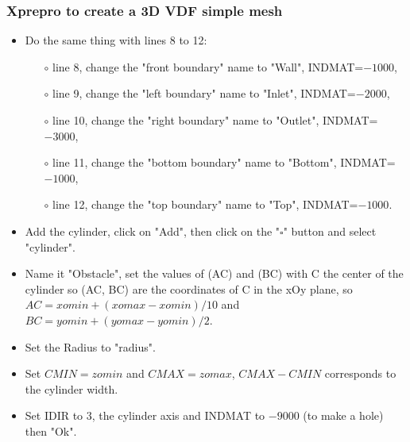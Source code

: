 \documentclass[10pt, hyperref={unicode=true,pdfusetitle, bookmarks=true,bookmarksnumbered=false,bookmarksopen=false, breaklinks=false,pdfborder={0 0 1},backref=true,colorlinks=true,linkcolor=darkblue,pageanchor}]{beamer}
\begin{document}
\begin{frame}
\frametitle{Xprepro to create a 3D VDF simple mesh}
\begin{block}{}

\begin{itemize}
\item Do the same thing with lines 8 to 12:
    \begin{itemize}
    \item [$\circ$] line 8, change the "front boundary" name to "Wall", INDMAT=$-1000$,
    \item [$\circ$] line 9, change the "left boundary" name to "Inlet", INDMAT=$-2000$,
    \item [$\circ$] line 10, change the "right boundary" name to "Outlet", INDMAT=$-3000$,
    \item [$\circ$] line 11, change the "bottom boundary" name to "Bottom", INDMAT=$-1000$,
    \item [$\circ$] line 12, change the "top boundary" name to "Top", INDMAT=$-1000$.
    \end{itemize}
\item Add the cylinder, click on "Add", then click on the "$\square$" button and select "cylinder".
\item Name it "Obstacle", set the values of (AC) and (BC) with C the center of the cylinder so (AC, BC) are the coordinates of C in the xOy plane, so $AC=xomin+(xomax-xomin)/10$ and $BC=yomin+(yomax-yomin)/2$.
\item Set the Radius to "radius".
\item Set $CMIN=zomin$ and $CMAX=zomax$, $CMAX-CMIN$ corresponds to the cylinder width.
\item Set IDIR to $3$, the cylinder axis and INDMAT to $-9000$ (to make a hole) then "Ok".

\end{itemize}

\end{block}
\end{frame}
\end{document}

